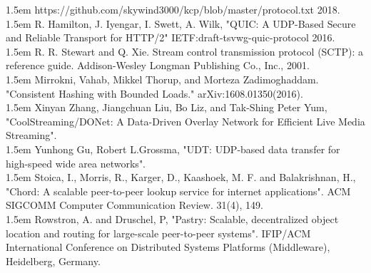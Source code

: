 \documentclass[10pt,a4paper]{article}
\begin{document}
\begin{thebibliography}{99}
\hangindent 1.5em
\noindent  
{} https://github.com/skywind3000/kcp/blob/master/protocol.txt 2018.
  \vspace{-1em}
\\

\hangindent 1.5em
\noindent  
{}R. Hamilton, J. Iyengar, I. Swett, A. Wilk, "QUIC: A UDP-Based Secure and Reliable Transport for HTTP/2" IETF:draft-tsvwg-quic-protocol 2016.
  \vspace{-1em}
\\

\hangindent 1.5em
\noindent  
{} R. R. Stewart and Q. Xie. Stream control transmission protocol (SCTP): a reference guide. Addison-Wesley Longman Publishing Co., Inc., 2001.
  \vspace{-1em}
\\

\hangindent 1.5em
\noindent  
{}Mirrokni, Vahab, Mikkel Thorup, and Morteza Zadimoghaddam. "Consistent Hashing with Bounded Loads." arXiv:1608.01350(2016).
  \vspace{-1em}
\\

\hangindent 1.5em
\noindent  
{}Xinyan Zhang, Jiangchuan Liu, Bo Liz, and Tak-Shing Peter Yum, "CoolStreaming/DONet: A Data-Driven Overlay Network for Efficient Live Media Streaming".
  \vspace{-1em}
\\

\hangindent 1.5em
\noindent  
{}Yunhong Gu, Robert L.Grossma, "UDT: UDP-based data transfer for high-speed wide area networks".
  \vspace{-1em}
\\

\hangindent 1.5em
\noindent  
{}Stoica, I., Morris, R., Karger, D., Kaashoek, M. F. and Balakrishnan, H., "Chord: A scalable peer-to-peer lookup service for internet applications". ACM SIGCOMM Computer Communication Review. 31(4), 149.
  \vspace{-1em}
\\

\hangindent 1.5em
\noindent  
{} Rowstron, A. and Druschel, P, "Pastry: Scalable, decentralized object location and routing for large-scale peer-to-peer systems". IFIP/ACM International Conference on Distributed Systems Platforms (Middleware), Heidelberg, Germany.
  \vspace{-1em}
\\


\end{thebibliography}
\end{document}
